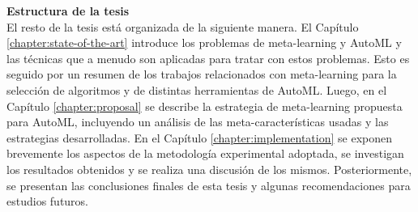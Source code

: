 \textbf{\Large Estructura de la tesis}\\

El resto de la tesis está organizada de la siguiente manera. El Capítulo
\ref{chapter:state-of-the-art} introduce los problemas de meta-learning y
AutoML y las técnicas que a menudo son aplicadas para tratar con estos
problemas. Esto es seguido por un resumen de los trabajos relacionados con
meta-learning para la selección de algoritmos y de distintas herramientas de
AutoML. Luego, en el Capítulo \ref{chapter:proposal} se describe la estrategia
de meta-learning propuesta para AutoML, incluyendo un análisis de las
meta-características usadas y las estrategias desarrolladas. En el Capítulo
\ref{chapter:implementation} se exponen brevemente los aspectos de la
metodología experimental adoptada, se investigan los resultados obtenidos y se
realiza una discusión de los mismos. Posteriormente, se presentan las
conclusiones finales de esta tesis y algunas recomendaciones para estudios
futuros.
